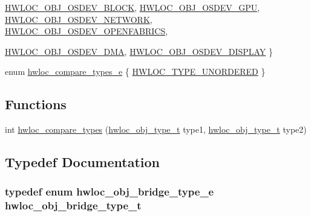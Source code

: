 \begin{DoxyCompactItemize}
\hyperlink{a00041_gga64f5d539df299c97ae80ce53fc4b56c0a689b0488c3c0d08d116751c6b9cb8871}{HWLOC\_\-OBJ\_\-OSDEV\_\-BLOCK}, 
\hyperlink{a00041_gga64f5d539df299c97ae80ce53fc4b56c0aa3a09798ef2836abb236dc3a645ffc90}{HWLOC\_\-OBJ\_\-OSDEV\_\-GPU}, 
\hyperlink{a00041_gga64f5d539df299c97ae80ce53fc4b56c0ab715d81155f771573c8682dffc65021b}{HWLOC\_\-OBJ\_\-OSDEV\_\-NETWORK}, 
\hyperlink{a00041_gga64f5d539df299c97ae80ce53fc4b56c0a52157d03694fdae82dddd57ca8c973b6}{HWLOC\_\-OBJ\_\-OSDEV\_\-OPENFABRICS}, 
\par
\hyperlink{a00041_gga64f5d539df299c97ae80ce53fc4b56c0a827ad1643360711a8b6c6af671366791}{HWLOC\_\-OBJ\_\-OSDEV\_\-DMA}, 
\hyperlink{a00041_gga64f5d539df299c97ae80ce53fc4b56c0a5da1cc266d3d288fdc639b0e800e9da4}{HWLOC\_\-OBJ\_\-OSDEV\_\-DISPLAY}
 \}
\item 
enum \hyperlink{a00041_ga46323568968005137c32f6a1cd405b74}{hwloc\_\-compare\_\-types\_\-e} \{ \hyperlink{a00041_gga46323568968005137c32f6a1cd405b74a2f8297ea36eba46e7596e810a67298fb}{HWLOC\_\-TYPE\_\-UNORDERED}
 \}
\end{DoxyCompactItemize}
\subsection*{Functions}
\begin{DoxyCompactItemize}
\item 
 int \hyperlink{a00041_gabd7da4f4ea12b420b8ecbde458b27805}{hwloc\_\-compare\_\-types} (\hyperlink{a00041_gacd37bb612667dc437d66bfb175a8dc55}{hwloc\_\-obj\_\-type\_\-t} type1, \hyperlink{a00041_gacd37bb612667dc437d66bfb175a8dc55}{hwloc\_\-obj\_\-type\_\-t} type2) 
\end{DoxyCompactItemize}


\subsection{Typedef Documentation}
\hypertarget{a00041_ga0a947e8c5adcc729b126bd09c01a0153}{
\subsubsection[{hwloc\_\-obj\_\-bridge\_\-type\_\-t}]{\setlength{\rightskip}{0pt plus 5cm}typedef enum {\bf hwloc\_\-obj\_\-bridge\_\-type\_\-e}  {\bf hwloc\_\-obj\_\-bridge\_\-type\_\-t}}}
\label{a00041_ga0a947e8c5adcc729b126bd09c01a0153}


